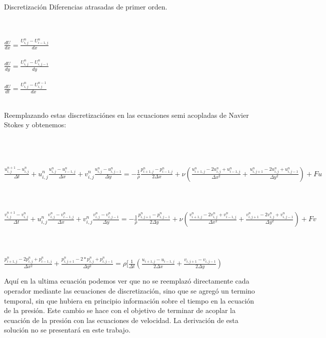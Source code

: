 \begin{section}{Discretización}
Diferencias atrasadas de primer orden.
\begin{center}

~\\
~\\
$\frac{dU}{dx} = \frac{U^{n}_{i,j} - U^{n}_{i-1,j}}{dx} $
~\\
~\\
$\frac{dU}{dy} = \frac{U^{n}_{i,j} - U^{n}_{i,j-1}}{dy} $
~\\
~\\
$\frac{dU}{dt} = \frac{U^{n}_{i,j} - U^{n-1}_{i,j}}{dx} $
~\\
~\\
\end{center}

Reemplazando estas discretizaciónes en las ecuaciones semi acopladas de Navier Stokes y obtenemos: 

\begin{center}
~\\
~\\
~\\
$\frac{u_{i,j}^{n+1}-u_{i,j}^{n}}{\Delta t}+u_{i,j}^{n}\frac{u_{i,j}^{n}-u_{i-1,j}^{n}}{\Delta x}+v_{i,j}^{n}\frac{u_{i,j}^{n}-u_{i,j-1}^{n}}{\Delta y}
=-\frac{1}{\rho}\frac{p_{i+1,j}^{n}-p_{i-1,j}^{n}}{2\Delta x}+\nu (\frac{u_{i+1,j}^{n}-2u_{i,j}^{n}+u_{i-1,j}^{n}}{\Delta x^2}+\frac{u_{i,j+1}^{n}-2u_{i,j}^{n}+u_{i,j-1}^{n}}{\Delta y^2}) + Fu$
~\\
~\\
~\\
$\frac{v_{i,j}^{n+1}-v_{i,j}^{n}}{\Delta t}+u_{i,j}^{n}\frac{v_{i,j}^{n}-v_{i-1,j}^{n}}{\Delta x}+v_{i,j}^{n}\frac{v_{i,j}^{n}-v_{i,j-1}^{n}}{\Delta y}=-\frac{1}{\rho}\frac{p_{i,j+1}^{n}-p_{i,j-1}^{n}}{2\Delta y}
+\nu(\frac{v_{i+1,j}^{n}-2v_{i,j}^{n}+v_{i-1,j}^{n}}{\Delta x^2}+\frac{v_{i,j+1}^{n}-2v_{i,j}^{n}+v_{i,j-1}^{n}}{\Delta y^2}) + Fv$
~\\
~\\
~\\
$\frac{p_{i+1,j}^{n}-2p_{i,j}^{n}+p_{i-1,j}^{n}}{\Delta x^2}+\frac{p_{i,j+1}^{n}-2*p_{i,j}^{n}+p_{i,j-1}^{n}}{\Delta y^2} 
=\rho[\frac{1}{\Delta t}(\frac{u_{i+1,j}-u_{i-1,j}}{2\Delta x}+\frac{v_{i,j+1}-v_{i,j-1}}{2\Delta y})$

\end{center}
Aquí en la ultima ecuación podemos ver que no se reemplazó directamente cada operador mediante las ecuaciones de discretización, sino que se agregó un termino temporal, sin que hubiera en principio información sobre el tiempo en la ecuación de la presión. Este cambio se hace con el objetivo de terminar de acoplar la ecuación de la presión con las ecuaciones de velocidad. La derivación de esta solución no se presentará en este trabajo.
~\\
~\\


\end{section}
